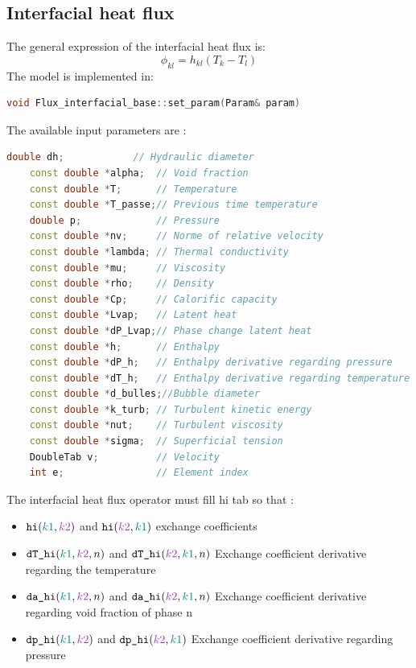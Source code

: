 \subsection{Interfacial heat flux}\label{sec:phyical_modeling_interface_heat_flux}
The general expression of the interfacial heat flux is:
\begin{equation}
    \phi_{kl}=h_{kl}(T_k-T_l)
\end{equation}
The model is implemented in:
\begin{lstlisting}[language=c++]
void Flux_interfacial_base::set_param(Param& param)
\end{lstlisting}
The available input parameters are :
\begin{lstlisting}[language=c++]
    double dh;            // Hydraulic diameter
    const double *alpha;  // Void fraction
    const double *T;      // Temperature
    const double *T_passe;// Previous time temperature
    double p;             // Pressure
    const double *nv;     // Norme of relative velocity
    const double *lambda; // Thermal conductivity
    const double *mu;     // Viscosity
    const double *rho;    // Density
    const double *Cp;     // Calorific capacity
    const double *Lvap;   // Latent heat
    const double *dP_Lvap;// Phase change latent heat
    const double *h;      // Enthalpy
    const double *dP_h;   // Enthalpy derivative regarding pressure
    const double *dT_h;   // Enthalpy derivative regarding temperature
    const double *d_bulles;//Bubble diameter
    const double *k_turb; // Turbulent kinetic energy
    const double *nut;    // Turbulent viscosity
    const double *sigma;  // Superficial tension
    DoubleTab v;          // Velocity
    int e;                // Element index
\end{lstlisting}
The interfacial heat flux operator must fill hi tab so that :
\begin{itemize}
    \item[\small \textcolor{blue}{\ding{109}}]$\texttt{hi}({\color{myteal}k1}, {\color{mydarkorchid}k2})$ and $\texttt{hi}({\color{mydarkorchid}k2},{\color{myteal}k1})$ exchange coefficients
    \item[\small \textcolor{blue}{\ding{109}}]$\texttt{dT\_hi}({\color{myteal}k1}, {\color{mydarkorchid}k2},n)$ and $\texttt{dT\_hi}({\color{mydarkorchid}k2},{\color{myteal}k1},n)$ Exchange coefficient derivative regarding the temperature
    \item[\small \textcolor{blue}{\ding{109}}]$\texttt{da\_hi}({\color{myteal}k1}, {\color{mydarkorchid}k2}, n)$ and $\texttt{da\_hi}({\color{mydarkorchid}k2}, {\color{myteal}k1}, n)$ Exchange coefficient derivative regarding  void fraction of phase n
    \item[\small \textcolor{blue}{\ding{109}}]$\texttt{dp\_hi}({\color{myteal}k1}, {\color{mydarkorchid}k2})$ and $\texttt{dp\_hi}({\color{mydarkorchid}k2}, {\color{myteal}k1})$ Exchange coefficient derivative regarding pressure
\end{itemize}

